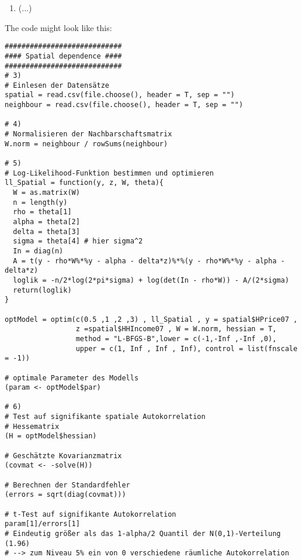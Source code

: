 \begin{Solution}{12.14}
\begin{enumerate}
\item (...)
\end{enumerate}

The code might look like this:
\begin{verbatim}
############################
#### Spatial dependence ####
############################
# 3)
# Einlesen der Datensätze
spatial = read.csv(file.choose(), header = T, sep = "")
neighbour = read.csv(file.choose(), header = T, sep = "")

# 4)
# Normalisieren der Nachbarschaftsmatrix
W.norm = neighbour / rowSums(neighbour)

# 5)
# Log-Likelihood-Funktion bestimmen und optimieren
ll_Spatial = function(y, z, W, theta){
  W = as.matrix(W)
  n = length(y)
  rho = theta[1]
  alpha = theta[2]
  delta = theta[3]
  sigma = theta[4] # hier sigma^2
  In = diag(n)
  A = t(y - rho*W%*%y - alpha - delta*z)%*%(y - rho*W%*%y - alpha - delta*z)
  loglik = -n/2*log(2*pi*sigma) + log(det(In - rho*W)) - A/(2*sigma)
  return(loglik)
}

optModel = optim(c(0.5 ,1 ,2 ,3) , ll_Spatial , y = spatial$HPrice07 ,
                 z =spatial$HHIncome07 , W = W.norm, hessian = T,
                 method = "L-BFGS-B",lower = c(-1,-Inf ,-Inf ,0),
                 upper = c(1, Inf , Inf , Inf), control = list(fnscale = -1))

# optimale Parameter des Modells
(param <- optModel$par)

# 6)
# Test auf signifikante spatiale Autokorrelation
# Hessematrix
(H = optModel$hessian)

# Geschätzte Kovarianzmatrix
(covmat <- -solve(H))

# Berechnen der Standardfehler
(errors = sqrt(diag(covmat)))

# t-Test auf signifikante Autokorrelation
param[1]/errors[1]
# Eindeutig größer als das 1-alpha/2 Quantil der N(0,1)-Verteilung (1.96)
# --> zum Niveau 5% ein von 0 verschiedene räumliche Autokorrelation
\end{verbatim}
\end{Solution}
